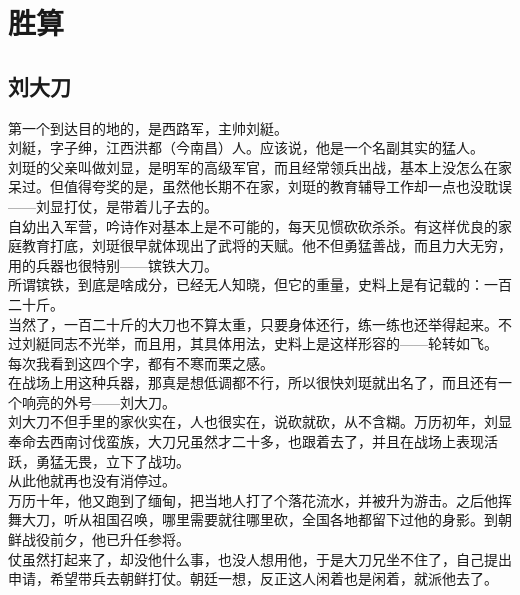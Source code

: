 \section{胜算}
\ifnum{}
	\begin{multicols}{\theparacolNo}
\fi
\subsection{刘大刀}
第一个到达目的地的，是西路军，主帅刘綎。\\

刘綎，字子绅，江西洪都（今南昌）人。应该说，他是一个名副其实的猛人。\\

刘珽的父亲叫做刘显，是明军的高级军官，而且经常领兵出战，基本上没怎么在家呆过。但值得夸奖的是，虽然他长期不在家，刘珽的教育辅导工作却一点也没耽误——刘显打仗，是带着儿子去的。\\

自幼出入军营，吟诗作对基本上是不可能的，每天见惯砍砍杀杀。有这样优良的家庭教育打底，刘珽很早就体现出了武将的天赋。他不但勇猛善战，而且力大无穷，用的兵器也很特别——镔铁大刀。\\

所谓镔铁，到底是啥成分，已经无人知晓，但它的重量，史料上是有记载的：一百二十斤。\\

当然了，一百二十斤的大刀也不算太重，只要身体还行，练一练也还举得起来。不过刘綎同志不光举，而且用，其具体用法，史料上是这样形容的——轮转如飞。\\

每次我看到这四个字，都有不寒而栗之感。\\

在战场上用这种兵器，那真是想低调都不行，所以很快刘珽就出名了，而且还有一个响亮的外号——刘大刀。\\

刘大刀不但手里的家伙实在，人也很实在，说砍就砍，从不含糊。万历初年，刘显奉命去西南讨伐蛮族，大刀兄虽然才二十多，也跟着去了，并且在战场上表现活跃，勇猛无畏，立下了战功。\\

从此他就再也没有消停过。\\

万历十年，他又跑到了缅甸，把当地人打了个落花流水，并被升为游击。之后他挥舞大刀，听从祖国召唤，哪里需要就往哪里砍，全国各地都留下过他的身影。到朝鲜战役前夕，他已升任参将。\\

仗虽然打起来了，却没他什么事，也没人想用他，于是大刀兄坐不住了，自己提出申请，希望带兵去朝鲜打仗。朝廷一想，反正这人闲着也是闲着，就派他去了。\\


\end{multicols}

